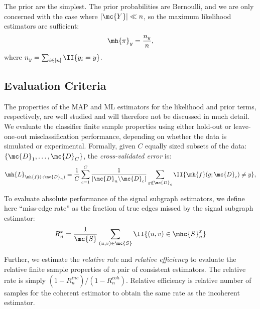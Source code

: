 \documentclass[10pt,journal,cspaper,compsoc]{IEEEtran}
\begin{document}
The prior are the simplest.  The prior probabilities are Bernoulli, and we are only concerned with the case where $|\mc{Y}| \ll n$, so the maximum likelihood estimators are sufficient:
\begin{align}
\mh{\pi}_y = \frac{n_y}{n},
\end{align}
where $n_y=\sum_{i \in [n]} \II\{y_i = y\}$.



\subsection{Evaluation Criteria} %
\label{sub:evaluation_criteria}

The properties of the MAP and ML estimators for the likelihood and prior terms, respectively, are well studied \cite{} and will therefore not be discussed in much detail.  We evaluate the classifier finite sample properties using either hold-out or leave-one-out misclassification performance, depending on whether the data is simulated or experimental.  Formally, given $C$ equally sized subsets of the data: $\{\mc{D}_{1}, \ldots, \mc{D}_{C}\}$, the \emph{cross-validated error} is:
\begin{align} \label{eq:L2}
	\mh{L}_{\mh{f}(\cdot; \mc{D}_n)} = \frac{1}{C}\sum_{c=1}^C \frac{1}{|\mc{D}_n \backslash \mc{D}_c|}\sum_{g \notin \mc{D}_c} \II\{\mh{f}(g; \mc{D}_{c}) \neq y\},
\end{align}




To evaluate absolute performance of the signal subgraph estimators, we define here ``miss-edge rate'' as the fraction of true edges missed by the signal subgraph estimator:
\begin{align}
R^x_n = \frac{1}{\mc{S}} \sum_{(u,v)\in \mc{S}}\II\{(u,v) \in \mhc{S}^x_n\}
\end{align}

Further, we estimate the \emph{relative rate} and \emph{relative efficiency} to evaluate the relative finite sample properties of a pair of consistent estimators. The relative rate is simply $(1-R^{inc}_n)/(1-R^{coh}_n)$.  Relative efficiency is relative number of samples for the coherent estimator to obtain the same rate as the incoherent estimator.
\end{document}
